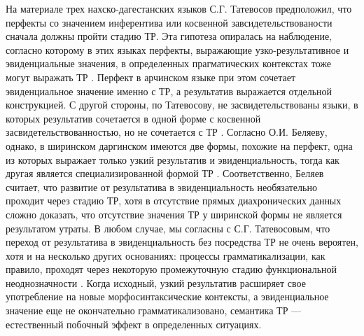 На материале трех нахско-дагестанских языков С.Г. Татевосов предположил, что перфекты со значением инферентива или косвенной завсидетельствованости сначала должны пройти стадию ТР. Эта гипотеза опиралась на наблюдение, согласно которому в этих языках перфекты, выражающие узко-результативное и эвиденциальные значения, в определенных прагматических контекстах тоже могут выражать ТР \citep[460--462]{tatevosov2001}. Перфект в арчинском языке при этом сочетает эвиденциальное значение именно с ТР, а результатив выражается отдельной конструкцией. С другой стороны, по Татевосову, не засвидетельствованы языки, в которых результатив сочетается в одной форме с косвенной засвидетельствованностью, но не сочетается с ТР \citep[460--462]{tatevosov2001}. Согласно О.И. Беляеву, однако, в ширинском даргинском имеются две формы, похожие на перфект, одна из которых выражает только узкий результатив и эвиденциальность, тогда как другая является специализированной формой  ТР \citep{belyaev2018}. %
Соответственно, Беляев считает, что развитие от результатива в эвиденциальность необязательно проходит через стадию ТР, хотя в отсутствие прямых диахронических данных сложно доказать, что отсутствие значения ТР у ширинской формы не является результатом утраты. В любом случае, мы согласны с С.Г. Татевосовым, что переход от результатива в эвиденциальность без посредства ТР не очень вероятен, хотя и на несколько других основаниях: процессы грамматикализации, как правило, проходят через некоторую промежуточную стадию функциональной неоднозначности \citep{diewald2006}. Когда исходный, узкий результатив расширяет свое употребление на новые морфосинтаксические контексты, а эвиденциальное значение еще не окончательно грамматикализовано, семантика ТР --- естественный побочный эффект в определенных ситуациях.
